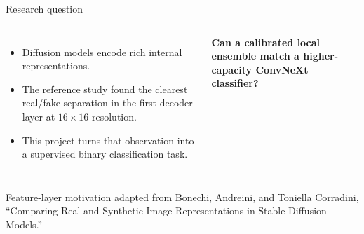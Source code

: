 \documentclass[11pt,aspectratio=169,t]{beamer}
\begin{document}
\begin{frame}{Research question}
  \begin{columns}[T,onlytextwidth]
      \vspace{0.25cm}
      \small
      \begin{itemize}
        \item Diffusion models encode rich internal representations.
        \item The reference study found the clearest real/fake separation in the first decoder layer at \(16\times16\) resolution.
        \item This project turns that observation into a supervised binary classification task.
      \end{itemize}
      \vspace{0.35cm}
      {\color{Navy}\bfseries\small Can a calibrated local ensemble match a higher-capacity ConvNeXt classifier?}
      \centering
  \end{columns}
  \vfill
  {\tiny\color{Muted}Feature-layer motivation adapted from Bonechi, Andreini, and Toniella Corradini, ``Comparing Real and Synthetic Image Representations in Stable Diffusion Models.''}
\end{frame}
\end{document}
